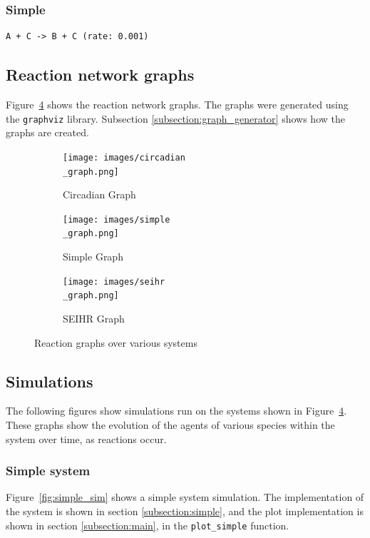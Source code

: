 \subsubsection{Simple}
\begin{verbatim}
A + C -> B + C (rate: 0.001)
\end{verbatim}

\subsection{Reaction network graphs}
Figure~\ref{fig:graphs} shows the reaction network graphs.
The graphs were generated using the \texttt{graphviz} library.
Subsection \ref{subsection:graph_generator} shows how the graphs are created.

\begin{figure}[H]
\centering
\begin{subfigure}{.3\textwidth}
  \centering
  \texttt{[image: images/circadian\\\_graph.png]}
  \caption{Circadian Graph}
  \label{fig:circadian}
\end{subfigure}%
\begin{subfigure}{.3\textwidth}
  \centering
  \texttt{[image: images/simple\\\_graph.png]}
  \caption{Simple Graph}
  \label{fig:simple}
\end{subfigure}
\begin{subfigure}{.3\textwidth}
  \centering
  \texttt{[image: images/seihr\\\_graph.png]}
  \caption{SEIHR Graph}
  \label{fig:seihr}
\end{subfigure}
\caption{Reaction graphs over various systems}
\label{fig:graphs}
\end{figure}

\subsection{Simulations}
The following figures show simulations run on the systems shown in Figure~\ref{fig:graphs}.
These graphs show the evolution of the agents of various species within the system over time, as reactions occur.

\subsubsection{Simple system}
Figure~\ref{fig:simple_sim} shows a simple system simulation.
The implementation of the system is shown in section \ref{subsection:simple}, and the plot implementation is shown in section \ref{subsection:main}, in the \texttt{plot\_simple} function.

